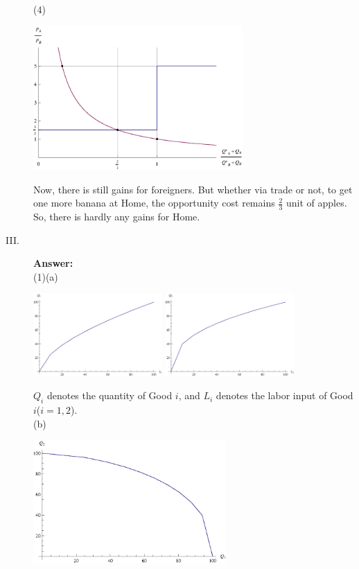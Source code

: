 \documentclass{article}
\begin{document}
\begin{description}
        (4) \begin{center}
                    \includegraphics[angle=0, width=0.65\textwidth]{ECON3610A15}
            \end{center}

            Now, there is still gains for foreigners. But whether via trade or not, to get one more banana at Home, the opportunity cost remains $\frac{2}{3}$ unit of apples.\\ So, there is hardly any gains for Home.\\
    \item[III.]{\bf Answer:}\\
        (1)(a)\begin{center}
                    \includegraphics[angle=0, width=0.4\textwidth]{ECON3610A16}
                    \includegraphics[angle=0, width=0.4\textwidth]{ECON3610A17}
            \end{center}
            $Q_i$ denotes the quantity of Good $i$, and $L_i$ denotes the labor input of Good $i$($i=1,2$).
            \\
           (b)\begin{center}
                    \includegraphics[angle=0, width=0.6\textwidth]{ECON3610A18}

\end{center}
\end{description}
\end{document}

